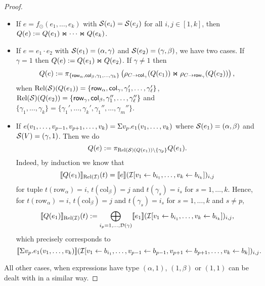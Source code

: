 \begin{proof}
\begin{itemize}
  \item If $e=f_\odot(e_1,\ldots, e_k)$ with $\mathcal{S}(e_i)=\mathcal{S}(e_j)$ for all $i,j\in[1,k]$, then $Q(e):=Q(e_1)\Join \cdots \Join Q(e_k)$.

  \item If $e=e_1\cdot e_2$ with $\mathcal{S} (e_1)=(\alpha, \gamma)$ and $\mathcal{S} (e_2)=(\gamma, \beta)$, we have two cases. If $\gamma = 1$ then $Q (e):=Q (e_1)\Join Q (e_2)$.
If $\gamma\neq 1$ then
$$
Q (e) := \pi_{\lbrace \mathsf{row}_{\alpha},\mathsf{col}_{\beta}, \gamma_1,\ldots,\gamma_k \rbrace}\left(\rho_{C\to \mathsf{col}_\gamma}(Q (e_1))\Join \rho_{C\to \mathsf{row}_\gamma}(Q (e_2)) \right),
$$
when $\text{Rel}(\mathcal{S})(Q(e_1))=\{\mathsf{row}_\alpha,\mathsf{col}_\gamma,\gamma_1',\ldots,\gamma_{\ell}'\}$,
$\text{Rel}(\mathcal{S})(Q(e_2))=\{\mathsf{row}_\gamma,\mathsf{col}_\beta,\gamma_1'',\ldots,\gamma_{\ell}''\}$ and $\{\gamma_1,\ldots,\gamma_k\}=\{\gamma_1',\ldots,\gamma_k',\gamma_1'',\ldots,\gamma_m''\}$.

  \item If $e(v_1,\ldots,v_{p-1},v_{p+1},\ldots,v_k)=\Sigma v_p. e_1(v_1,\ldots,v_k)$ where $\mathcal{S}(e_1)=(\alpha,\beta)$ and $\mathcal{S}(V)=(\gamma,1)$. Then we do 
  $$
  Q (e):=\pi_{\text{Rel}(\mathcal{S})(Q(e_1))\setminus\{\gamma_p\}} Q (e_1).
  $$
 Indeed, by induction we know that 
 $$
\llbracket Q(e_1) \rrbracket_{\text{Rel}(\mathcal{I})}(t)=\llbracket e \rrbracket(\mathcal{I}[v_1\gets b_{i_1},\ldots,v_k\gets b_{i_k}])_{i,j}
$$
for tuple $t(\mathrm{row}_\alpha)=i$, $t(\mathrm{col}_\beta)=j$ and $t(\gamma_s)=i_s$ for $s=1,\ldots, k$.
Hence, for $t(\mathrm{row}_\alpha)=i$, $t(\mathrm{col}_\beta)=j$ and $t(\gamma_s)=i_s$ for $s=1,\ldots, k$ and $s\neq p$,
$$
\llbracket Q(e_1) \rrbracket_{\text{Rel}(\mathcal{I})}(t):=\bigoplus_{i_p=1,\ldots,\mathcal{D}(\gamma)} \llbracket e_1 \rrbracket(\mathcal{I}[v_1\gets b_{i_1},\ldots,v_k\gets b_{i_k}])_{i,j},$$
which precisely corresponds to 
$$
\llbracket \Sigma v_p. e_1(v_1,\ldots,v_k) \rrbracket(\mathcal{I}[v_1\gets b_{i_1},\ldots,v_{p-1}\gets b_{p-1},v_{p+1}\gets b_{p+1},\ldots,v_k\gets b_k])_{i,j}.
$$

\end{itemize}
All other cases, when expressions have type $(\alpha,1)$, $(1,\beta)$ or $(1,1)$ can be dealt with in a similar way.
\end{proof}
